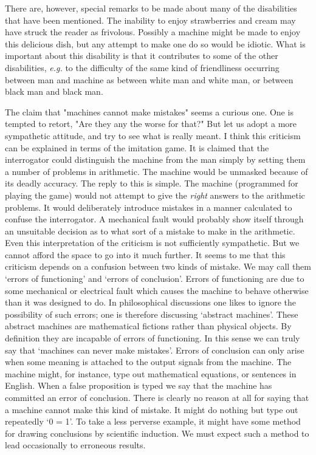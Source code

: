     There are, however, special remarks to be made about many of the disabilities that have been mentioned. The inability to enjoy strawberries and cream may have struck the reader as frivolous. Possibly a machine might be made to enjoy this delicious dish, but any attempt to make one do so would be idiotic. What is important about this disability is that it contributes to some of the other disabilities, \textit{e.g.} to the difficulty of the same kind of friendliness occurring between man and machine as between white man and white man, or between black man and black man.

    The claim that "machines cannot make mistakes" seems a curious one. One is tempted to retort, "Are they any the worse for that?" But let us adopt a more sympathetic attitude, and try to see what is really meant. I think this criticism can be explained in terms of the imitation game. It is claimed that the interrogator could distinguish the machine from the man simply by setting them a number of problems in arithmetic. The machine would be unmasked because of its deadly accuracy. The reply to this is simple. The machine (programmed for playing the game) would not attempt to give the \textit{right} answers to the arithmetic problems. It would deliberately introduce mistakes in a manner calculated to confuse the interrogator. A mechanical fault would probably show itself through an unsuitable decision as to what sort of a mistake to make in the arithmetic. Even this interpretation of the criticism is not sufficiently sympathetic. But we cannot afford the space to go into it much further. It seems to me that this criticism depends on a confusion between two kinds of mistake. We may call them ‘errors of functioning' and ‘errors of conclusion'. Errors of functioning are due to some mechanical or electrical fault which causes the machine to behave otherwise than it was designed to do. In philosophical discussions one likes to ignore the possibility of such errors; one is therefore discussing ‘abstract machines'. These abstract machines are mathematical fictions rather than physical objects. By definition they are incapable of errors of functioning. In this sense we can truly say that ‘machines can never make mistakes'. Errors of conclusion can only arise when some meaning is attached to the output signals from the machine. The machine might, for instance, type out mathematical equations, or sentences in English. When a false proposition is typed we say that the machine has committed an error of conclusion. There is clearly no reason at all for saying that a machine cannot make this kind of mistake. It might do nothing but type out repeatedly ‘0 = 1'. To take a less perverse example, it might have some method for drawing conclusions by scientific induction. We must expect such a method to lead occasionally to erroneous results.

